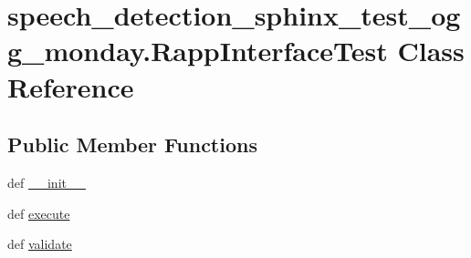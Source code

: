 \hypertarget{classspeech__detection__sphinx__test__ogg__monday_1_1RappInterfaceTest}{\section{speech\-\_\-detection\-\_\-sphinx\-\_\-test\-\_\-ogg\-\_\-monday.\-Rapp\-Interface\-Test Class Reference}
\label{classspeech__detection__sphinx__test__ogg__monday_1_1RappInterfaceTest}
}
\subsection*{Public Member Functions}
\begin{DoxyCompactItemize}
\item 
def \hyperlink{classspeech__detection__sphinx__test__ogg__monday_1_1RappInterfaceTest_a32105201d63bac09cd08255b2c8ccad4}{\-\_\-\-\_\-init\-\_\-\-\_\-}
\item 
def \hyperlink{classspeech__detection__sphinx__test__ogg__monday_1_1RappInterfaceTest_a48c50070e1142c74373069c4598e6729}{execute}
\item 
def \hyperlink{classspeech__detection__sphinx__test__ogg__monday_1_1RappInterfaceTest_aa7ff694f83649c9a23d6fbfce4b36ff2}{validate}
\end{DoxyCompactItemize}
